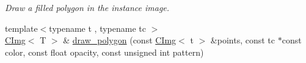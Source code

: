 \begin{DoxyCompactItemize}
\begin{DoxyCompactList}\small\item\em Draw a filled polygon in the instance image. \item\end{DoxyCompactList}\item 
\hypertarget{structcimg__library_1_1CImg_a4800e4fe339084fe88380a0aa86e3339}{
{\footnotesize template$<$typename t , typename tc $>$ }\\\hyperlink{structcimg__library_1_1CImg}{CImg}$<$ T $>$ \& \hyperlink{structcimg__library_1_1CImg_a4800e4fe339084fe88380a0aa86e3339}{draw\_\-polygon} (const \hyperlink{structcimg__library_1_1CImg}{CImg}$<$ t $>$ \&points, const tc $\ast$const color, const float opacity, const unsigned int pattern)}
\label{structcimg__library_1_1CImg_a4800e4fe339084fe88380a0aa86e3339}


\end{DoxyCompactItemize}
